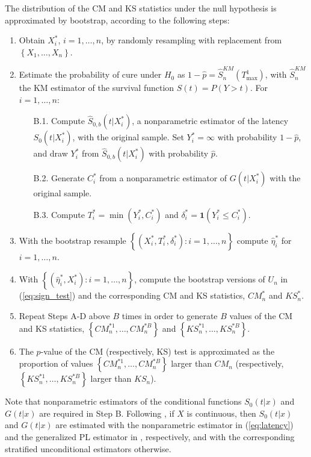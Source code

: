 The distribution of the CM and KS statistics under the null hypothesis is approximated by bootstrap, according to the following steps:
\begin{enumerate}[label=\Alph*.]
\item Obtain $X_i^*$, $i=1,\ldots,n$, by randomly resampling with replacement from $\left \{X_1,\ldots,X_n\right \}$.
\item Estimate the probability of cure under $H_0$ as $1-\hat p=\hat S_n^{KM}\left(T^1_{\max} \right)$, with $\hat S_n^{KM}$ the KM estimator of the survival function $S(t)=P\left(Y>t \right)$. For $i=1,\ldots,n$:
  \begin{enumerate}
  \item[B.1.] Compute $\hat S_{0,b}\left(t|X_i^\ast \right)$, a nonparametric estimator of the latency $S_0\left(t|X_i^\ast \right)$, with the original sample. Set $Y_i^\ast=\infty$ with probability $1-\hat p$, and draw $Y_i^\ast$ from $\hat S_{0,b}(t|X_i^*)$ with probability $\hat p$.
  \item[B.2.] Generate $C_i^\ast$ from a nonparametric estimator of $G\left(t|X_i^\ast \right)$ with the original sample.
  \item[B.3.] Compute $T_i^\ast=\min \left(Y_i^\ast, C_i^\ast \right)$ and $\delta_i^*=\mathbf{1}\left(Y_i^\ast \leq C_i^\ast \right)$.
  \end{enumerate}
\item With the bootstrap resample $\left \{\left(X_i^*, T_i^*, \delta_i^* \right):i=1,\ldots,n \right\}$ compute $\hat\eta_i^*$ for $i=1,\ldots,n$.
\item With $\left \{\left(\hat\eta_i^*, X_i^* \right): i=1,\ldots,n\right \}$, compute the bootstrap versions of $U_n$ in (\ref{eq:sign_test}) and the corresponding CM and KS statistics, $CM_n^*$ and $KS_n^*$.
\item {Repeat Steps A-D above $B$ times in order to generate $B$ values of the CM and KS statistics, $\left \{CM_n^{\ast 1},\ldots, CM_n^{\ast B}\right \}$ and $\left \{KS_n^{\ast 1},\ldots, KS_n^{\ast B}\right \}$.}
\item The $p$-value of the CM (respectively, KS) test is approximated as the proportion of values $\left \{CM_n^{\ast 1},\ldots, CM_n^{\ast B}\right \}$ larger than $CM_n$ (respectively, $\left \{KS_n^{\ast 1},\ldots, KS_n^{\ast B}\right \}$ larger than $KS_n$).
\end{enumerate}

Note that nonparametric estimators of the conditional functions $S_0\left (t|x \right)$ and $G \left(t|x \right)$ are required in Step B. Following \cite{Lopez3}, if $X$ is continuous, then $S_0\left(t|x \right)$ and $G\left(t|x \right)$ are estimated with the nonparametric estimator in (\ref{eq:latency}) and the generalized PL estimator in \cite{Beran}, respectively, and with the corresponding stratified unconditional estimators otherwise.

